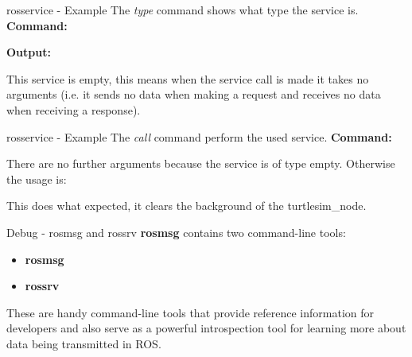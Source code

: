 \documentclass{beamer}
\begin{document}
\begin{frame}{rosservice - Example}
The \textit{type} command shows what type the service is.
\newline
\newline
\textbf{Command:} 

\textbf{Output:}

This service is empty, this means when the service call is made it takes no arguments (i.e. it sends no data when making a request and receives no data when receiving a response).
\end{frame}
\begin{frame}{rosservice - Example}
The \textit{call} command perform the used service.
\textbf{Command:} 

There are no further arguments because the service is of type empty.
\newline
Otherwise the usage is:

This does what expected, it clears the background of the turtlesim\_node.
\begin{figure}[h]\centering
\end{figure}
\end{frame}
\begin{frame}{Debug - rosmsg and rossrv}
	\textbf{rosmsg} contains two command-line tools:
	\begin{itemize}
		\item \textbf{rosmsg}
		\item \textbf{rossrv}
	\end{itemize}
	These are handy command-line tools that provide reference information for developers and also serve as a powerful introspection tool for learning more about data being transmitted in ROS.
\end{frame}
\end{document}
